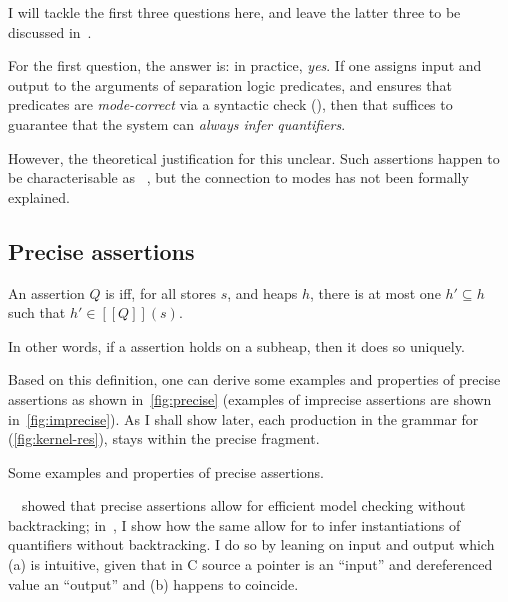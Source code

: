 I will tackle the first three questions here, and leave the latter three
to be discussed in~.

For the first question, the answer is: in practice, \emph{yes}. If one assigns
input and output  to the arguments of separation logic predicates,
and ensures that predicates are \emph{mode-correct} via a syntactic check
(), then that suffices to guarantee that the system
can \emph{always infer quantifiers}.

However, the theoretical justification for this unclear. Such assertions happen
to be characterisable as ~, but the
connection to modes has not been formally explained.

\subsection{Precise assertions}\label{subsec:precise-assertion}

\begin{definition}%
\label{def:precise-assertion}
    \AP{} An assertion $Q$ is  iff, for all stores $s$, and heaps
    $h$, there is at most one $h' \subseteq{} h$ such that $h' \in [\![ Q ]\!] (s)$.

    In other words, if a  assertion holds on a subheap, then it
    does so uniquely.
\end{definition}

Based on this definition, one can derive some examples and properties of
precise assertions as shown in~\cref{fig:precise} (examples of imprecise
assertions are shown in~\cref{fig:imprecise}). As I shall show later, each
production in the grammar for  
(\cref{fig:kernel-res}), stays within the precise fragment.

\begin{marginfigure}
%
\caption{Some examples and properties of precise assertions.}\label{fig:precise}
\end{marginfigure}

\citeauthor{brotherston2016model}~~showed that
precise assertions allow for efficient model checking without backtracking;
in~, I show how the same allow for  to infer
instantiations of quantifiers without backtracking. I do so by leaning on input
and output  which (a) is intuitive, given that in C source a pointer
is an ``input'' and dereferenced value an ``output'' and (b) happens to
coincide.

